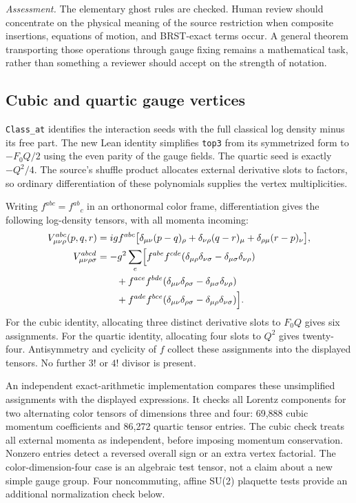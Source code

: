\documentclass[11pt]{article}
\newcommand{\code}[1]{{\small\nolinkurl{#1}}}
\begin{document}
\emph{Assessment.} The elementary ghost rules are checked. Human review
should concentrate on the physical meaning of the source restriction when
composite insertions, equations of motion, and BRST-exact terms occur. A
general theorem transporting those operations through gauge fixing remains
a mathematical task, rather than something a reviewer should accept on
the strength of notation.

\subsection{Cubic and quartic gauge vertices}

\code{Class_at} identifies the interaction seeds with the full classical
log density minus its free part. The new Lean identity simplifies
\code{top3} from its symmetrized form to $-F_0Q/2$ using the even parity
of the gauge fields. The quartic seed is exactly $-Q^2/4$. The source's
shuffle product allocates external derivative slots to factors, so ordinary
differentiation of these polynomials supplies the vertex multiplicities.

Writing $f^{abc}=f^{ab}{}_c$ in an orthonormal color frame, differentiation
gives the following log-density tensors, with all momenta incoming:
\begin{align}
 V^{abc}_{\mu\nu\rho}(p,q,r)
 &=ig f^{abc}\bigl[
 \delta_{\mu\nu}(p-q)_\rho+
 \delta_{\nu\rho}(q-r)_\mu+
 \delta_{\rho\mu}(r-p)_\nu\bigr],\label{eq:checked-cubic}\\
 V^{abcd}_{\mu\nu\rho\sigma}
 &=-g^2\sum_e\Bigl[
 f^{abe}f^{cde}(\delta_{\mu\rho}\delta_{\nu\sigma}
                  -\delta_{\mu\sigma}\delta_{\nu\rho})\nonumber\\
 &\qquad+f^{ace}f^{bde}(\delta_{\mu\nu}\delta_{\rho\sigma}
                  -\delta_{\mu\sigma}\delta_{\nu\rho})\nonumber\\
 &\qquad+f^{ade}f^{bce}(\delta_{\mu\nu}\delta_{\rho\sigma}
                  -\delta_{\mu\rho}\delta_{\nu\sigma})\Bigr].\label{eq:checked-quartic}
\end{align}
For the cubic identity, allocating three distinct derivative slots to
$F_0Q$ gives six assignments. For the quartic identity, allocating four
slots to $Q^2$ gives twenty-four. Antisymmetry and cyclicity of $f$ collect
these assignments into the displayed tensors. No further $3!$ or $4!$
divisor is present.

An independent exact-arithmetic implementation compares these unsimplified
assignments with the displayed expressions. It checks all Lorentz
components for two alternating color tensors of dimensions three and four:
69,888 cubic momentum coefficients and 86,272 quartic tensor entries.
The cubic check treats all external momenta as independent, before imposing
momentum conservation. Nonzero entries detect a reversed overall sign or
an extra vertex factorial. The color-dimension-four case is an algebraic
test tensor, not a claim about a new simple gauge group. Four noncommuting,
affine SU(2) plaquette tests provide an additional normalization check below.
\end{document}
